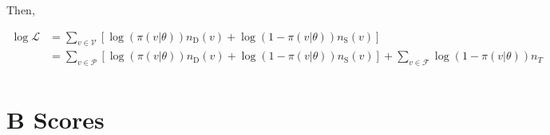 \documentclass[11pt]{article}
\begin{document}
Then, 

\begin{align}
  \log\mathcal{L} &= \sum_{v \in \mathcal{V}} \left[\log(\pi(v | \theta)) n_\text{D}(v) + \log(1-\pi(v | \theta)) n_\text{S}(v)\right] \\
                  &= \sum_{v \in \mathcal{P}} \left[\log(\pi(v | \theta)) n_\text{D}(v) + \log(1-\pi(v | \theta)) n_\text{S}(v)\right] + \sum_{v \in \mathcal{F}} \log(1-\pi(v | \theta)) n_T  \\
\end{align}



\section{B Scores}
\end{document}
